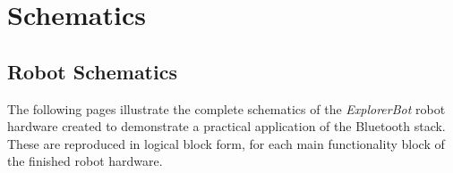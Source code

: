 \chapter{Schematics}
\label{Appendix A}

\section{Robot Schematics}

The following pages illustrate the complete schematics of the \emph{ExplorerBot} robot
hardware created to demonstrate a practical application of the Bluetooth stack. These
are reproduced in logical block form, for each main functionality block of the finished
robot hardware.



